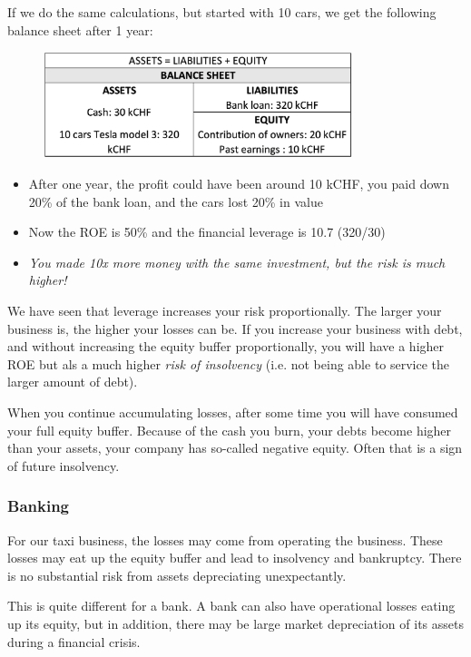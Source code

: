 \documentclass[a4paper]{extarticle}
\begin{document}
\begin{ebox}
    If we do the same calculations, but started with 10 cars, we get the following balance sheet after 1 year:

    \begin{figure}[H]
        \includegraphics[width=9cm]{../images/EnpRisk_Fig3-4}
        \centering
    \end{figure}

    \begin{itemize}
        \item After one year, the profit could have been around 10 kCHF, you paid down 20\% of the bank loan, and the cars lost 20\% in value
        \item Now the ROE is 50\% and the financial leverage is 10.7 (320/30)
        \item \textit{You made 10x more money with the same investment, but the risk is much higher!}
    \end{itemize}
\end{ebox}

We have seen that leverage increases your risk proportionally. The larger your business is, the higher your losses can be. If you increase your business with debt, and without increasing the equity buffer proportionally, you will have a higher ROE but als a much higher \textit{risk of insolvency} (i.e. not being able to service the larger amount of debt).

When you continue accumulating losses, after some time you will have consumed your full equity buffer. Because of the cash you burn, your debts become higher than your assets, your company has so-called negative equity. Often that is a sign of future insolvency.

\subsubsection{Banking}

For our taxi business, the losses may come from operating the business. These losses may eat up the equity buffer and lead to insolvency and bankruptcy. There is no substantial risk from assets depreciating unexpectantly.

This is quite different for a bank. A bank can also have operational losses eating up its equity, but in addition, there may be large market depreciation of its assets during a financial crisis.
\end{document}
